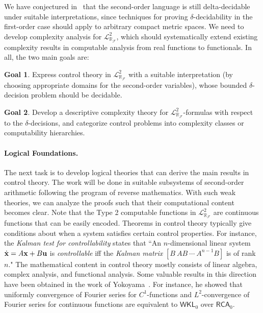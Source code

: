 \documentclass[10pt]{article}
\newcommand{\lrf}{\mathcal{L}_{\mathbb{R}_{\mathcal{F}}}}
\theoremstyle{definition}
\newtheorem{goal}{Goal}
\begin{document}
We have conjectured in~\cite{DBLP:conf/lics/GaoAC12} that the second-order language is still delta-decidable under suitable interpretations, since techniques for proving $\delta$-decidability in the first-order case should apply to arbitrary compact metric spaces. We need to develop complexity analysis for $\lrf^2$, which should systematically extend existing complexity results in computable analysis from real functions to functionals. In all, the two main goals are:
\begin{goal}
Express control theory in $\mathcal{L}^2_{\mathbb{R}_{\mathcal{F}}}$ with a suitable interpretation (by choosing appropriate domains for the second-order variables), whose bounded $\delta$-decision problem should be decidable.
\end{goal}
\begin{goal}
Develop a descriptive complexity theory for $\lrf^2$-formulas with respect to the $\delta$-decisions, and categorize control problems into complexity classes or computability hierarchies.
\end{goal}

\paragraph{Logical Foundations.}

The next task is to develop logical theories that can derive the main results in control theory.
The work will be done in suitable subsystems of second-order arithmetic following the program of reverse mathematics. With such weak theories, we can analyze the proofs such that their computational content becomes clear. Note that the Type 2 computable functions in  $\lrf^2$ are continuous functions that can be easily encoded. Theorems in control theory typically give conditions about when a system satisfies certain control properties. For instance, the {\em Kalman test for controllability} states that ``An $n$-dimensional linear system $\dot {\bf x} = A{\bf x}+B{\bf u}$ is {\em controllable} iff the {\em Kalman matrix}
$[B\ AB\ \cdots\ A^{n-1}B]$ is of rank $n$." The mathematical content in control theory mostly consists of linear algebra, complex analysis, and functional analysis. Some valuable results in this direction have been obtained in the work of Yokoyama~\cite{yoko}. For instance, he showed that uniformly convergence of Fourier series for $C^1$-functions and $L^2$-convergence of Fourier series for continuous functions are equivalent to $\mathsf{WKL}_0$ over $\mathsf{RCA}_0$. 
\end{document}
